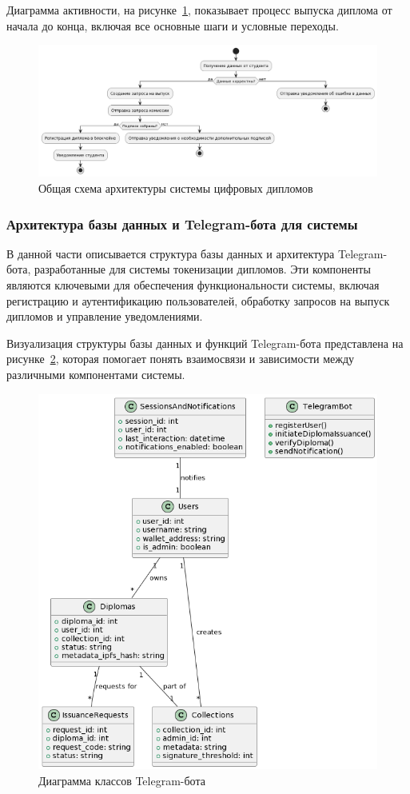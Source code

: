 Диаграмма активности, на рисунке~\ref{fig:ifcs}, показывает процесс выпуска диплома от начала до конца, включая все основные шаги и условные переходы.
\begin{figure}[H]
	\centering
	\includegraphics[width=.9\textwidth]{images/ifcs.png}
	\parskip=6pt
	\caption{Общая схема архитектуры системы цифровых дипломов}
	\label{fig:ifcs}
\end{figure}

\subsubsection{Архитектура базы данных и Telegram-бота для системы}

В данной части описывается структура базы данных и архитектура Telegram-бота, разработанные для системы токенизации дипломов. Эти компоненты являются ключевыми для обеспечения функциональности системы, включая регистрацию и аутентификацию пользователей, обработку запросов на выпуск дипломов и управление уведомлениями.

Визуализация структуры базы данных и функций Telegram-бота представлена на рисунке~\ref{fig:tg_dc}, которая помогает понять взаимосвязи и зависимости между различными компонентами системы.

\begin{figure}[H]
	\centering
	\includegraphics[width=.9\textwidth]{images/tg_dc.png}
	\parskip=6pt
	\caption{Диаграмма классов Telegram-бота}
	\label{fig:tg_dc}
\end{figure}

